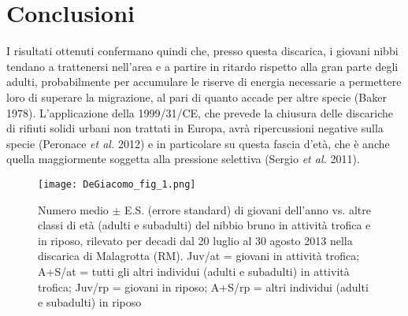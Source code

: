 \section*{Conclusioni}

I risultati ottenuti confermano quindi che, presso questa discarica, i
giovani nibbi tendano a trattenersi nell{\textquoteright}area e a
partire in ritardo rispetto alla gran parte degli adulti, probabilmente
per accumulare le riserve di energia necessarie a permettere loro di
superare la migrazione, al pari di quanto accade per altre specie
(Baker 1978). L{\textquoteright}applicazione della 1999/31/CE, che
prevede la chiusura delle discariche di rifiuti solidi urbani non
trattati in Europa, avr\`a ripercussioni negative sulla specie
(Peronace \textit{et al.} 2012) e in particolare su questa fascia
d{\textquoteright}et\`a, che \`e anche quella maggiormente soggetta
alla pressione selettiva (Sergio \textit{et al.} 2011).

\begin{figure}[!h]
\centering
\texttt{[image: DeGiacomo\_fig\_1.png]}
\caption{Numero medio $\pm$ E.S. (errore standard) di giovani dell{\textquoteright}anno vs. altre classi di et\`a (adulti e subadulti) del nibbio bruno in attivit\`a trofica e in riposo, rilevato per decadi dal 20 luglio al 30 agosto 2013 nella discarica di Malagrotta (RM). Juv/at = giovani in attivit\`a trofica; A+S/at = tutti gli altri individui (adulti e subadulti) in attivit\`a trofica; Juv/rp = giovani in riposo; A+S/rp = altri individui (adulti e subadulti) in riposo}
\label{DeGiacomo_fig_1}
\end{figure}

